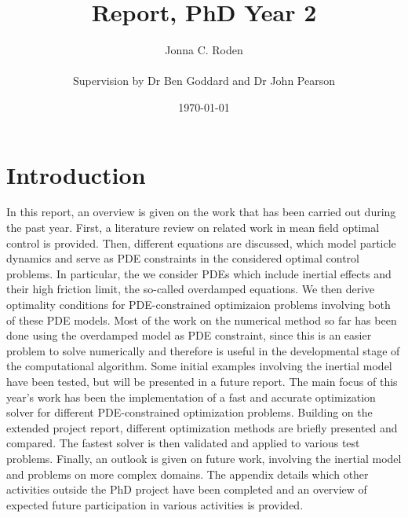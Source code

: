 \documentclass[11pt, a4paper]{article}
\title{Report, PhD Year 2}
\author{Jonna C. Roden\\ \\Supervision by Dr Ben Goddard and Dr John Pearson}
\date{\today}
\theoremstyle{definition}
\begin{document}
	
	\maketitle
%		
%	
%
\section{Introduction}
In this report, an overview is given on the work that has been carried out during the past year. First, a literature review on related work in mean field optimal control is provided. Then, different equations are discussed, which model particle dynamics and serve as PDE constraints in the considered optimal control problems. In particular, the we consider PDEs which include inertial effects and their high friction limit, the so-called overdamped equations. We then derive optimality conditions for PDE-constrained optimizaion problems involving both of these PDE models. Most of the work on the numerical method so far has been done using the overdamped model as PDE constraint, since this is an easier problem to solve numerically and therefore is useful in the developmental stage of the computational algorithm. Some initial examples involving the inertial model have been tested, but will be presented in a future report. 
The main focus of this year's work has been the implementation of a fast and accurate optimization solver for different PDE-constrained optimization problems. Building on the extended project report, different optimization methods are briefly presented and compared. The fastest solver is then validated and applied to various test problems.
Finally, an outlook is given on future work, involving the inertial model and problems on more complex domains. The appendix details which other activities outside the PhD project have been completed and an overview of expected future participation in various activities is provided.
\end{document}
